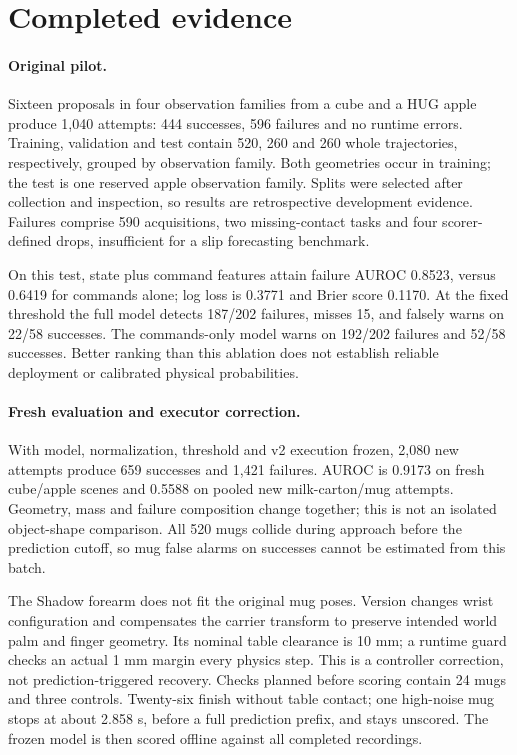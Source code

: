 \documentclass[10pt,letterpaper]{article}
\begin{document}
\section{Completed evidence}
\paragraph{Original pilot.}
Sixteen proposals in four observation families from a cube and a HUG apple
produce 1,040 attempts: 444 successes, 596 failures and no runtime errors.
Training, validation and test contain 520, 260 and 260 whole trajectories,
respectively, grouped by observation family. Both geometries occur in training;
the test is one reserved apple observation family. Splits were selected after
collection and inspection, so results are retrospective development evidence.
Failures comprise 590 acquisitions, two missing-contact tasks and four
scorer-defined drops, insufficient for a slip forecasting benchmark.

On this test, state plus command features attain failure AUROC 0.8523, versus
0.6419 for commands alone; log loss is 0.3771 and Brier score 0.1170.
At the fixed threshold the full model detects 187/202 failures, misses 15,
and falsely warns on 22/58 successes. The commands-only model warns on
192/202 failures and 52/58 successes. Better ranking than this ablation does
not establish reliable deployment or calibrated physical probabilities.

\paragraph{Fresh evaluation and executor correction.}
With model, normalization, threshold and v2 execution frozen, 2,080 new attempts
produce 659 successes and 1,421 failures. AUROC is 0.9173 on fresh cube/apple
scenes and 0.5588 on pooled new milk-carton/mug attempts. Geometry, mass and
failure composition change together; this is not an isolated object-shape
comparison. All 520 mugs collide during approach before the prediction cutoff,
so mug false alarms on successes cannot be estimated from this batch.

The Shadow forearm does not fit the original mug poses. Version
 changes wrist configuration and
compensates the carrier transform to preserve intended world palm and finger
geometry. Its nominal table clearance is 10 mm; a runtime guard checks an
actual 1 mm margin every physics step. This is a controller correction, not
prediction-triggered recovery. Checks planned before scoring contain 24 mugs
and three controls. Twenty-six finish without table contact; one high-noise
mug stops at about 2.858 s, before a full prediction prefix, and stays unscored.
The frozen model is then scored offline against all completed recordings.
\end{document}
